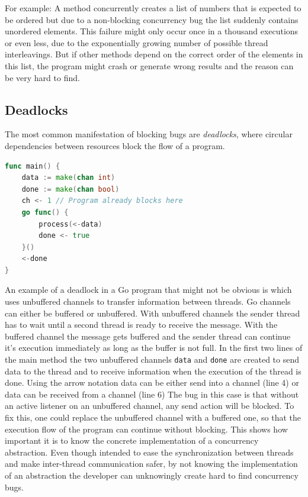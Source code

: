\documentclass[conference]{IEEEtran}
\begin{document}
For example: A method concurrently creates a list of numbers that is expected to be ordered but due to a non-blocking concurrency bug the list suddenly contains unordered elements.
This failure might only occur once in a thousand executions or even less, due to the exponentially growing number of possible thread interleavings.
But if other methods depend on the correct order of the elements in this list, the program might crash or generate wrong results and the reason can be very hard to find.

\subsection{Deadlocks}

The most common manifestation of blocking bugs are \emph{deadlocks}, where circular dependencies between resources block the flow of a program.

\begin{lstlisting}[float=h, language=Go, label=lst:deadlockCh, caption={Deadlock caused by misuse of an \emph{unbuffered Channel}}]
func main() {
    data := make(chan int)
    done := make(chan bool)
    ch <- 1 // Program already blocks here
    go func() {
        process(<-data)
        done <- true
    }()
    <-done
}
\end{lstlisting}

An example of a deadlock in a Go program that might not be obvious is  which uses unbuffered channels to transfer information between threads.
Go channels can either be buffered or unbuffered.
With unbuffered channels the sender thread has to wait until a second thread is ready to receive the message.
With the buffered channel the message gets buffered and the sender thread can continue it's execution immediately as long as the buffer is not full.
In the first two lines of the main method the two unbuffered channels \lstinline{data} and \lstinline{done} are created to send data to the thread and to receive information when the execution of the thread is done.
Using the arrow notation data can be either send into a channel (line 4) or data can be received from a channel (line 6)
The bug in this case is that without an active listener on an unbuffered channel, any send action will be blocked.
To fix this, one could replace the unbuffered channel with a buffered one, so that the execution flow of the program can continue without blocking.
This shows how important it is to know the concrete implementation of a concurrency abstraction.
Even though intended to ease the synchronization between threads and make inter-thread communication safer, by not knowing the implementation of an abstraction the developer can unknowingly create hard to find concurrency bugs.
\end{document}
